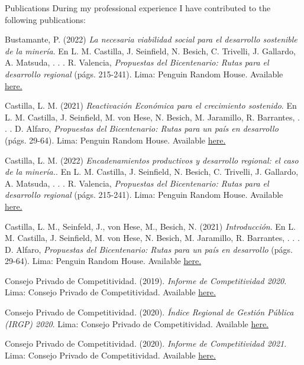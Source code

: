 \documentclass{resume} %
\begin{document}
\begin{rSection}{Publications}
During my professional experience I have contributed to the following publications:
\item Bustamante, P. (2022) \emph{La necesaria viabilidad social para el desarrollo sostenible de la minería}. En L. M. Castilla, J. Seinfield, N. Besich, C. Trivelli, J. Gallardo, A. Matsuda, . . . R. Valencia, \textit{Propuestas del Bicentenario: Rutas para el desarrollo regional} (págs. 215-241). Lima: Penguin Random House. Available \href{https://www.casadellibro.com/ebook-propuestas-del-bicentenario-ebook/9786125068026/13125397}{here.} 
\item Castilla, L. M. (2021) \emph{Reactivación Económica para el crecimiento sostenido}. En L. M. Castilla, J. Seinfield, M. von Hese, N. Besich, M. Jaramillo, R. Barrantes, . . . D. Alfaro, \textit{Propuestas del Bicentenario: Rutas para un país en desarrollo} (págs. 29-64). Lima: Penguin Random House. Available \href{https://www.casadellibro.com/ebook-propuestas-del-bicentenario-ebook/9786124272813/12336851}{here.}
\item Castilla, L. M. (2022) \emph{Encadenamientos productivos y desarrollo regional: el caso de la minería.}.  En L. M. Castilla, J. Seinfield, N. Besich, C. Trivelli, J. Gallardo, A. Matsuda, . . . R. Valencia, \textit{Propuestas del Bicentenario: Rutas para el desarrollo regional} (págs. 215-241). Lima: Penguin Random House. Available \href{https://www.casadellibro.com/ebook-propuestas-del-bicentenario-ebook/9786125068026/13125397}{here.} 
\item Castilla, L. M., Seinfeld, J., von Hese, M., Besich, N. (2021) \emph{Introducción}. En L. M. Castilla, J. Seinfield, M. von Hese, N. Besich, M. Jaramillo, R. Barrantes, . . . D. Alfaro, \textit{Propuestas del Bicentenario: Rutas para un país en desarrollo} (págs. 29-64). Lima: Penguin Random House. Available \href{https://www.casadellibro.com/ebook-propuestas-del-bicentenario-ebook/9786124272813/12336851}{here.}
\item Consejo Privado de Competitividad. (2019). \emph{Informe de Competitividad 2020}. Lima: Consejo Privado de Competitividad. Available \href{https://www.compite.pe/wp-content/uploads/2019/11/CPC_Peru_INC-2020_Libro-Web-Paginas.pdf}{here.}
\item Consejo Privado de Competitividad. (2020). \emph{Índice Regional de Gestión Pública (IRGP) 2020}. Lima: Consejo Privado de Competitividad. Available \href{https://www.compite.pe/wp-content/uploads/2020/07/IRGP-2020-version-final.pdf}{here.}
\item Consejo Privado de Competitividad. (2020). \emph{Informe de Competitividad 2021}. Lima: Consejo Privado de Competitividad. Available \href{https://www.compite.pe/wp-content/uploads/2021/01/Informe-de-Competitividad-2021-CPC.pdf}{here.}
\end{rSection} 
\end{document}
